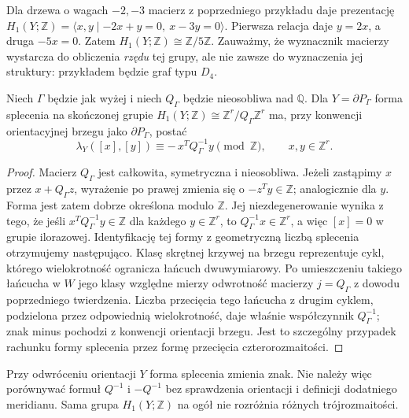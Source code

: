 \begin{przyklad}
Dla drzewa o wagach $-2,-3$ macierz z poprzedniego
przykładu daje prezentację
$H_1(Y;\mathbb Z)=\langle x,y\mid -2x+y=0,\ x-3y=0\rangle$.
Pierwsza relacja daje $y=2x$, a druga $-5x=0$.
Zatem $H_1(Y;\mathbb Z)\cong\mathbb Z/5\mathbb Z$.
Zauważmy, że wyznacznik macierzy wystarcza do obliczenia
\emph{rzędu} tej grupy, ale nie zawsze do wyznaczenia
jej struktury: przykładem będzie graf typu $D_4$.
\end{przyklad}

\begin{stwierdzenie}
Niech $\Gamma$ będzie jak wyżej i niech $Q_\Gamma$ będzie
nieosobliwa nad $\mathbb Q$. Dla $Y=\partial P_\Gamma$
forma splecenia na skończonej grupie
$H_1(Y;\mathbb Z)\cong\mathbb Z^r/Q_\Gamma\mathbb Z^r$
ma, przy konwencji orientacyjnej brzegu jako $\partial P_\Gamma$,
postać
\[
\lambda_Y([x],[y])\equiv-\,x^TQ_\Gamma^{-1}y
\pmod{\mathbb Z}, \qquad x,y\in\mathbb Z^r.
\]
\end{stwierdzenie}

\begin{proof}
Macierz $Q_\Gamma$ jest całkowita, symetryczna i nieosobliwa.
Jeżeli zastąpimy $x$ przez $x+Q_\Gamma z$, wyrażenie po prawej
zmienia się o $-z^Ty\in\mathbb Z$; analogicznie dla $y$.
Forma jest zatem dobrze określona modulo $\mathbb Z$.
Jej niezdegenerowanie wynika z tego, że jeśli
$x^TQ_\Gamma^{-1}y\in\mathbb Z$ dla każdego $y\in\mathbb Z^r$,
to $Q_\Gamma^{-1}x\in\mathbb Z^r$, a więc
$[x]=0$ w grupie ilorazowej. Identyfikację tej formy
z geometryczną liczbą splecenia otrzymujemy następująco.
Klasę skrętnej krzywej na brzegu reprezentuje cykl, którego
wielokrotność ogranicza łańcuch dwuwymiarowy.
Po umieszczeniu takiego łańcucha w $W$ jego klasy
względne mierzy odwrotność macierzy $j=Q_\Gamma$ z
dowodu poprzedniego twierdzenia. Liczba przecięcia tego
łańcucha z drugim cyklem, podzielona przez odpowiednią
wielokrotność, daje właśnie współczynnik $Q_\Gamma^{-1}$;
znak minus pochodzi z konwencji orientacji brzegu.
Jest to szczególny przypadek rachunku formy splecenia
przez formę przecięcia czterorozmaitości.
\end{proof}

\begin{uwaga}
Przy odwróceniu orientacji $Y$ forma splecenia zmienia znak.
Nie należy więc porównywać formuł $Q^{-1}$ i $-Q^{-1}$
bez sprawdzenia orientacji i definicji dodatniego meridianu.
Sama grupa $H_1(Y;\mathbb Z)$ na ogół nie rozróżnia
różnych trójrozmaitości.
\end{uwaga}

